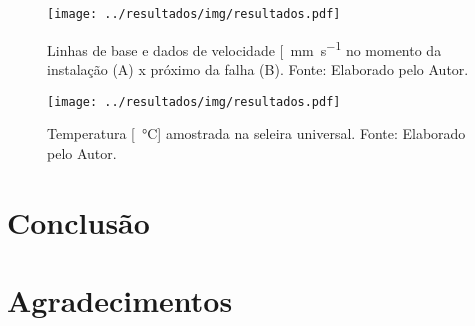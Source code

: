 \documentclass[a4paper]{ifacconf}
\begin{document}
\begin{figure}[h!]
  \begin{center}
      \texttt{[image: ../resultados/img/resultados.pdf]}
  \end{center}
  \caption{Linhas de base e dados de velocidade [\SI{}{\milli\metre\per\second} no momento da instalação
  (A) x próximo da falha (B). Fonte: Elaborado pelo Autor.}
  \label{fig:seleira_universal_antes_depois}
\end{figure}


\begin{figure}[h!]
  \begin{center}
      \texttt{[image: ../resultados/img/resultados.pdf]}
  \end{center}
  \caption{Temperatura [\SI{}{\celsius}] amostrada na seleira universal. Fonte: Elaborado pelo Autor.}
  \label{fig:seleira_universal_temperatura}
\end{figure}


\section{Conclusão}


\section*{Agradecimentos}


\end{document}
